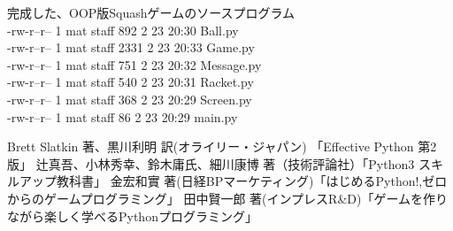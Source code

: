 \documentclass[uplatex,a4paper,11pt,oneside,openany]{jsbook}
\begin{document}
完成した、OOP版Squashゲームのソースプログラム\\

-rw-r--r--  1 mat  staff   892  2 23 20:30 Ball.py\\
-rw-r--r--  1 mat  staff  2331  2 23 20:33 Game.py\\
-rw-r--r--  1 mat  staff   751  2 23 20:32 Message.py\\
-rw-r--r--  1 mat  staff   540  2 23 20:31 Racket.py\\
-rw-r--r--  1 mat  staff   368  2 23 20:29 Screen.py\\
-rw-r--r--  1 mat  staff    86  2 23 20:29 main.py\\


%
%
\begin{thebibliography}{99}
   Brett Slatkin 著、黒川利明 訳(オライリー・ジャパン) 「Effective Python 第2版」
   辻真吾、小林秀幸、鈴木庸氏、細川康博 著（技術評論社）「Python3 スキルアップ教科書」
   金宏和實 著(日経BPマーケティング)「はじめるPython!,ゼロからのゲームプログラミング」
   田中賢一郎 著(インプレスR\&D)「ゲームを作りながら楽しく学べるPythonプログラミング」
\end{thebibliography}
%
\end{document}
